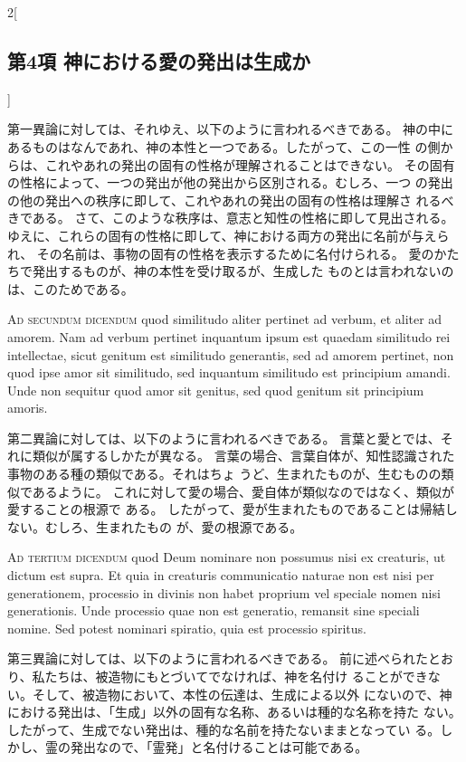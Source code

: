 \documentclass[paper=a4paper,fontsize=10pt,jafontsize=9pt,titlepage]{jlreq}
\begin{document}
\begin{paracol}{2}[\subsection{第4項 神における愛の発出は生成か}]
\switchcolumn


第一異論に対しては、それゆえ、以下のように言われるべきである。
神の中にあるものはなんであれ、神の本性と一つである。したがって、この一性
 の側からは、これやあれの発出の固有の性格が理解されることはできない。
その固有の性格によって、一つの発出が他の発出から区別される。むしろ、一つ
 の発出の他の発出への秩序に即して、これやあれの発出の固有の性格は理解さ
 れるべきである。
さて、このような秩序は、意志と知性の性格に即して見出される。
ゆえに、これらの固有の性格に即して、神における両方の発出に名前が与えられ、
 その名前は、事物の固有の性格を表示するために名付けられる。
愛のかたちで発出するものが、神の本性を受け取るが、生成した
 ものとは言われないのは、このためである。


\switchcolumn*[\subsection{ad.2}]


{\scshape Ad secundum dicendum} quod similitudo aliter pertinet ad
 verbum, et aliter ad amorem. Nam ad verbum pertinet inquantum ipsum est
 quaedam similitudo rei intellectae, sicut genitum est similitudo
 generantis, sed ad amorem pertinet, non quod ipse amor sit similitudo,
 sed inquantum similitudo est principium amandi. Unde non sequitur quod
 amor sit genitus, sed quod genitum sit principium amoris.


\switchcolumn


第二異論に対しては、以下のように言われるべきである。
言葉と愛とでは、それに類似が属するしかたが異なる。
言葉の場合、言葉自体が、知性認識された事物のある種の類似である。それはちょ
 うど、生まれたものが、生むものの類似であるように。
これに対して愛の場合、愛自体が類似なのではなく、類似が愛することの根源で
 ある。
したがって、愛が生まれたものであることは帰結しない。むしろ、生まれたもの
 が、愛の根源である。


\switchcolumn*[\subsection{ad.3}]


{\scshape Ad tertium dicendum} quod Deum nominare non possumus nisi ex
 creaturis, ut dictum est supra. Et quia in creaturis communicatio
 naturae non est nisi per generationem, processio in divinis non habet
 proprium vel speciale nomen nisi generationis. Unde processio quae non
 est generatio, remansit sine speciali nomine. Sed potest nominari
 spiratio, quia est processio spiritus.


\switchcolumn


第三異論に対しては、以下のように言われるべきである。
前に述べられたとおり、私たちは、被造物にもとづいてでなければ、神を名付け
 ることができない。そして、被造物において、本性の伝達は、生成による以外
 にないので、神における発出は、「生成」以外の固有な名称、あるいは種的な名称を持た
 ない。したがって、生成でない発出は、種的な名前を持たないままとなってい
 る。しかし、霊の発出なので、「霊発」と名付けることは可能である。


\switchcolumn*



\end{paracol}
\end{document}
